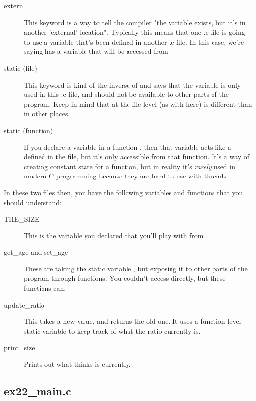 \begin{description}
\item[extern] This keyword is a way to tell the compiler "the variable exists,
    but it's in another 'external' location".  Typically this means that one
    .c file is going to use a variable that's been defined in another .c file.
    In this case, we're saying  has a variable 
    that will be accessed from .
\item[static (file)] This keyword is kind of the inverse of  and says
    that the variable is only used in this .c file, and should not be available
    to other parts of the program.  Keep in mind that  at the
    file level (as with  here) is different than in other places.
\item[static (function)] If you declare a variable in a function , then
    that variable acts like a  defined in the file, but it's only
    accessible from that function. It's a way of creating constant state for a
    function, but in reality it's \emph{rarely} used in modern C programming
    because they are hard to use with threads.
\end{description}

In these two files then, you have the following variables and functions
that you should understand:

\begin{description}
\item[THE\_SIZE] This is the variable you declared  that you'll
    play with from .
\item[get\_age and set\_age] These are taking the static variable ,
    but exposing it to other parts of the program through functions.  You couldn't
    access  directly, but these functions can.
\item[update\_ratio] This takes a new  value, and returns the old
    one.  It uses a function level static variable  to keep track
    of what the ratio currently is.
\item[print\_size] Prints out what  thinks  is
    currently.
\end{description}

\subsection{ex22\_main.c}

